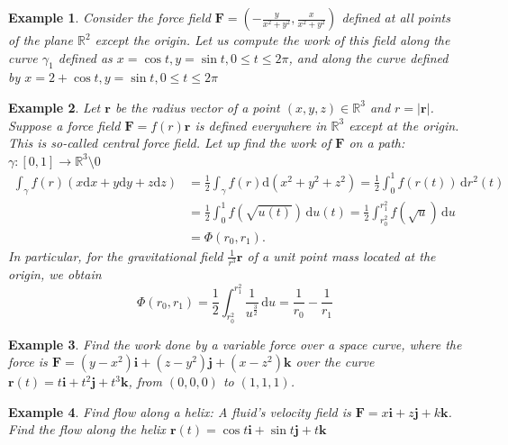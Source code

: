 \documentclass[a4paper,12pt]{article}
\newtheorem{example}{Example}             %
\begin{document}
\begin{CJK}{UTF8}{gbsn}
\begin{example}
    Consider the force field $\displaystyle \bm{F} = \left(-\frac{y}{x^2 + y^2},
    \frac{x}{x^2 + y^2}\right)$ defined at all points of the plane $\mathbb{R}^2$ 
    except the origin. Let us compute the work of this field along the curve 
    $\gamma_1$ defined as $\displaystyle x = \cos t, y = \sin t, 0 \le t \le 2\pi$, and 
    along the curve defined by $\displaystyle x = 2 + \cos t, y = \sin t ,
    0 \le t \le 2\pi$
\end{example}

\begin{example}
    Let $\bm{r}$ be the radius vector of a point $(x,y,z) \in \mathbb{R}^3$
    and $r = \left|\bm{r}\right|$. Suppose a force field $\bm{F} = f(r)
    \bm{r}$ is defined everywhere in $\mathbb{R}^3$ except at the origin. 
    This is so-called central force field. Let up find the work of $\bm{F}$
    on a path: $\displaystyle \gamma: [0,1] \to \mathbb{R}^3 \setminus 0$
    \[
        \begin{split}
        \int_{\gamma}f(r)(x\mathrm{d}x + y\mathrm{d}y + z\mathrm{d}z) 
            & = \frac{1}{2}\int_{\gamma}f(r)\mathrm{d}(x^2+y^2+z^2)
            =\frac{1}{2}\int_0^1f(r(t))\,\mathrm{d}r^2(t) \\
            & = \frac{1}{2}\int_0^1f\left(\sqrt{u(t)}\right)\, \mathrm{d}u(t)
              = \frac{1}{2}\int_{r_0^2}^{r_1^2}f\left(\sqrt{u}\right)\, \mathrm{d}u \\
            & = \Phi(r_0,r_1).
        \end{split}
    \]
In particular, for the gravitational field $\displaystyle 
    \frac{1}{r^3}\bm{r}$ of a unit point mass located at 
    the origin, we obtain 
    \[
        \Phi(r_0,r_1) = \frac{1}{2} \int_{r_0^2}^{r_1^2}\frac{1}
        {u^{\frac{3}{2}}}\, \mathrm{d}u = \frac{1}{r_0} 
        - \frac{1}{r_1}
    \]
\end{example}
\begin{example}
    Find the work done by a variable force over a space curve, where 
    the force is $\bm{F} = (y-x^2)\bm{i} + (z-y^2)\bm{j} 
    + (x-z^2)\bm{k}$ over the curve $\bm{r}(t) = t\bm{i} + 
    t^2\bm{j}+t^3\bm{k}$, from $(0,0,0)$ to $(1,1,1)$.
\end{example}

\begin{example}
    Find flow along a helix: A fluid's velocity field is 
    $\displaystyle \bm{F} = x\bm{i} + z \bm{j} + k \bm{k} $.
    Find the flow along the helix $\bm{r}(t) = \cos t\bm{i} + 
    \sin t \bm{j} + t\bm{k}$
\end{example}


\end{CJK}
\end{document}
